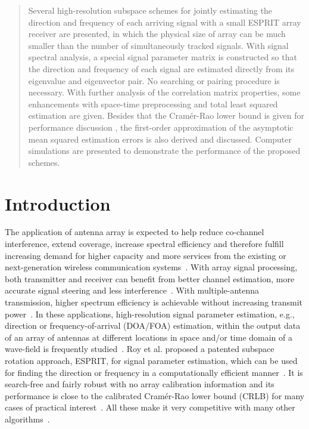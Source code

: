\documentclass[conference]{IEEEtran}
\begin{document}
\begin{abstract}
Several high-resolution subspace schemes for jointly estimating
the direction and frequency of each arriving signal with a small
ESPRIT array receiver are presented, in which the physical size of
array can be much smaller than the number of simultaneously
tracked signals. With signal spectral analysis, a special signal
parameter matrix is constructed so that the direction and
frequency of each signal are estimated directly from its
eigenvalue and eigenvector pair. No searching or pairing procedure
is necessary. With further analysis of the correlation matrix
properties, some enhancements with space-time preprocessing and
total least squared estimation are given. Besides that the
Cram\'er-Rao lower bound is given for performance discussion , the
first-order approximation of the asymptotic mean squared
estimation errors is also derived and discussed. Computer
simulations are presented to demonstrate the performance of the
proposed schemes.
\end{abstract}
\section{Introduction}
The application of antenna array is expected to help reduce
co-channel interference, extend coverage, increase spectral
efficiency and therefore fulfill increasing demand for higher
capacity and more services from the existing or next-generation
wireless communication systems~\cite{Ghav05,Dohl07}. With array
signal processing, both transmitter and receiver can benefit from
better channel estimation, more accurate signal steering and less
interference~\cite{Ghav05}. With multiple-antenna transmission,
higher spectrum efficiency is achievable without increasing
transmit power~\cite{Dohl07}. In these applications,
high-resolution signal parameter estimation, e.g., direction or
frequency-of-arrival (DOA/FOA) estimation, within the output data
of an array of antennas at different locations in space and/or
time domain of a wave-field is frequently studied~\cite{Ghav05}.
Roy et al. proposed a patented subspace rotation approach, ESPRIT,
for signal parameter estimation, which can be used for finding the
direction or frequency in a computationally efficient
manner~\cite{Roy89}. It is search-free and fairly robust with no
array calibration information and its performance is close to the
calibrated Cram\'er-Rao lower bound (CRLB) for many cases of
practical interest~\cite{Roy89}. All these make it very
competitive with many other algorithms~\cite{Ghav05}.
\end{document}
